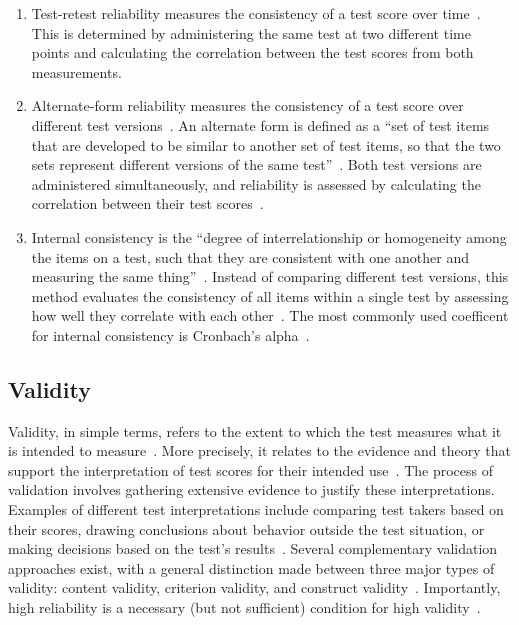 \documentclass{DESSThesis}
\begin{document}
\begin{enumerate}
	\item Test-retest reliability measures the consistency of a test score over time~\cite{moosbrugger_testtheorie_2020}. This is determined by administering the same test at two different time points and calculating the correlation between the test scores from both measurements.
	\item Alternate-form reliability measures the consistency of a test score over different test versions~\cite{moosbrugger_testtheorie_2020}. An alternate form is defined as a ``set of test items that are developed to be similar to another set of test items, so that the two sets represent different versions of the same test''~\cite{apa_dictionary_of_psychology_alternate_2018}. Both test versions are administered simultaneously, and reliability is assessed by calculating the correlation between their test scores~\cite{moosbrugger_testtheorie_2020}.
	\item Internal consistency is the ``degree of interrelationship or homogeneity among the items on a test, such that they are consistent with one another and measuring the same thing''~\cite{apa_dictionary_of_psychology_internal_2018}. Instead of comparing different test versions, this method evaluates the consistency of all items within a single test by assessing how well they correlate with each other~\cite{rammstedt_reliabilitat_2010}. The most commonly used coefficent for internal consistency is Cronbach's alpha~\cite{cronbach_coefficient_1951}.
\end{enumerate}


\subsection{Validity}
Validity, in simple terms, refers to the extent to which the test measures what it is intended to measure~\cite{rammstedt_reliabilitat_2010}. More precisely, it relates to the evidence and theory that support the interpretation of test scores for their intended use~\cite{american_educational_research_association_standards_2014}.
The process of validation involves gathering extensive evidence to justify these interpretations. Examples of different test interpretations include comparing test takers based on their scores, drawing conclusions about behavior outside the test situation, or making decisions based on the test's results~\cite{kane_validating_2013, moosbrugger_testtheorie_2020}. 
Several complementary validation approaches exist, with a general distinction made between three major types of validity: content validity, criterion validity, and construct validity~\cite{apa_dictionary_of_psychology_validity_2018, rammstedt_reliabilitat_2010}. 
Importantly, high reliability is a necessary (but not sufficient) condition for high validity~\cite{moosbrugger_testtheorie_2020}. 
\end{document}
